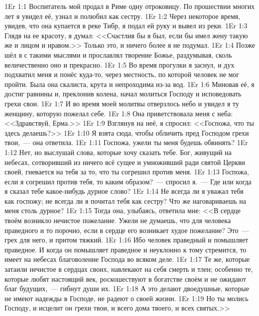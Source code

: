\vs 1Er 1:1
Воспитатель мой продал в Риме одну отроковицу.
По прошествии многих лет я увидел её, узнал и полюбил как сестру.
\vs 1Er 1:2
Через некоторое время, увидев, что она купается в реке Тибр,
я подал ей руку и вывел из реки.
\vs 1Er 1:3
Глядя на ее красоту, я думал:
<<Счастлив бы я был, если бы имел жену такую же и лицом и нравом.>>
Только это, и ничего более я не подумал.
\vs 1Er 1:4
Позже шёл я с такими мыслями и прославлял творение Божье,
раздумывая, сколь величественно оно и прекрасно.
\vs 1Er 1:5
Во время прогулки я заснул, и дух подхватил меня
и понёс куда-то, через местность,
по которой человек не мог пройти.
Была она скалиста, крута и непроходима из-за вод.
\vs 1Er 1:6
Миновав её, я достиг равнины и, преклонив колена,
начал молиться Господу и исповедовать грехи свои.
\vs 1Er 1:7
И во время моей молитвы отверзлось небо
и увидел я ту женщину, которую пожелал себе.
\vs 1Er 1:8
Она приветствовала меня с неба:
<<Здравствуй, Ерма.>>
\vs 1Er 1:9
Взглянув на неё, я спросил:
<<Госпожа, что ты здесь делаешь?>>
\vs 1Er 1:10
Я взята сюда, чтобы обличить пред Господом грехи твои,~--- она ответила.
\vs 1Er 1:11
Госпожа, ужели ты меня будешь обвинять?
\vs 1Er 1:12
Нет, но выслушай слова, которые хочу сказать тебе.
Бог, живущий на небесах, сотворивший из ничего всё
сущее и умноживший ради святой Церкви своей,
гневается на тебя за то, что ты согрешил против меня.
\vs 1Er 1:13
Госпожа, если я согрешил против тебя,
то каким образом?~--- спросил я.~--- Где или когда я сказал тебе
какое-нибудь дурное слово?
\vs 1Er 1:14
Не всегда ли я уважал тебя как госпожу;
не всегда ли я почитал тебя как сестру?
Что же наговариваешь на меня столь дурное?
\vs 1Er 1:15
Тогда она, улыбаясь, ответила мне:
<<В сердце твоём возникло нечистое пожелание.
Ужели не думаешь, что для человека праведного и то порочно,
если в сердце его возникает худое пожелание?
Это~--- грех для него, и притом тяжкий.
\vs 1Er 1:16
Ибо человек праведный и помышляет праведное.
И когда он помышляет праведное и неуклонно к тому стремится,
то имеет на небесах благоволение Господа во всяком деле.
\vs 1Er 1:17
Те же, которые затаили нечистое в сердцах своих,
навлекают на себя смерть и тлен; особенно те,
которые любят настоящий век, роскошествуют
в богатстве своём и не ожидают благ будущих,~--- гибнут души их.
\vs 1Er 1:18
А это делают двоедушные, которые не имеют надежды
в Господе, не радеют о своей жизни.
\vs 1Er 1:19
Но ты молись Господу, и исцелит он грехи твои,
и всего дома твоего, и всех святых.>>


